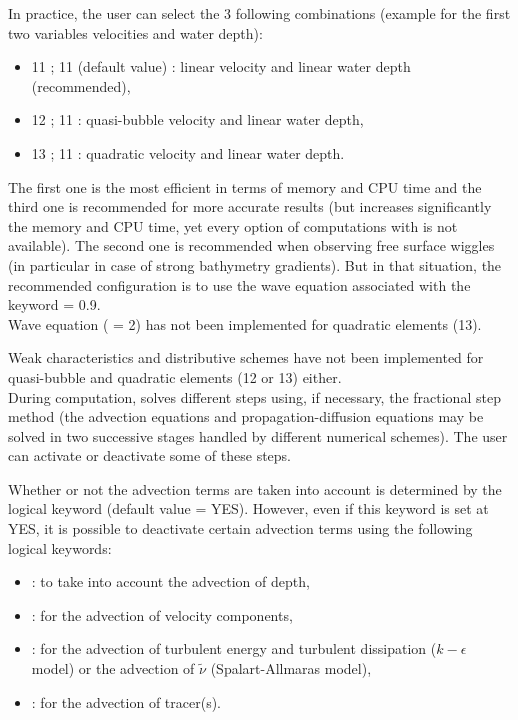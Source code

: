 In practice, the user can select the 3 following combinations
(example for the first two variables velocities and water depth):

\begin{itemize}
\item 11 ; 11 (default value) : linear velocity and linear water depth
(recommended),

\item 12 ; 11 : quasi-bubble velocity and linear water depth,

\item 13 ; 11 : quadratic velocity and linear water depth.
\end{itemize}

The first one is the most efficient in terms of memory and CPU time
and the third one is recommended for more accurate results
(but increases significantly the memory and CPU time,
yet every option of computations with  is not available).
The second one is recommended when observing free surface wiggles
(in particular in case of strong bathymetry gradients).
But in that situation, the recommended configuration is to use the wave equation
associated with the keyword  = 0.9.\\

Wave equation ( = 2) has not been
implemented for quadratic elements (13).

Weak characteristics and distributive schemes have not been implemented
for quasi-bubble and quadratic elements (12 or 13) either.\\

During computation,  solves different steps using, if necessary,
the fractional step method (the advection equations and propagation-diffusion
equations may be solved in two successive stages handled by different numerical
schemes).
The user can activate or deactivate some of these steps.

Whether or not the advection terms are taken into account is determined
by the logical keyword  (default value = YES).
However, even if this keyword is set at YES, it is possible
to deactivate certain advection terms using the following logical keywords:

\begin{itemize}
\item {}: to take into account the advection of depth,

\item {}: for the advection of velocity components,

\item {}: for the advection of turbulent energy
and turbulent dissipation ($k-\epsilon$ model)
or the advection of $\tilde{\nu}$ (Spalart-Allmaras model),

\item {}: for the advection of tracer(s).
\end{itemize}

